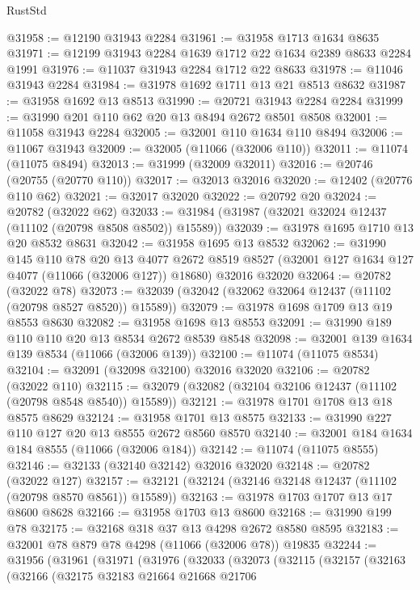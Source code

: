 \begin{lexlean}{RustStd}
\begin{coremodule}
@31958 := @12190 @31943 @2284
@31961 := @31958 @1713 @1634 @8635
@31971 := @12199 @31943 @2284 @1639 @1712 @22 @1634 @2389 @8633 @2284 @1991
@31976 := @11037 @31943 @2284 @1712 @22 @8633
@31978 := @11046 @31943 @2284
@31984 := @31978 @1692 @1711 @13 @21 @8513 @8632
@31987 := @31958 @1692 @13 @8513
@31990 := @20721 @31943 @2284 @2284
@31999 := @31990 @201 @110 @62 @20 @13 @8494 @2672 @8501 @8508
@32001 := @11058 @31943 @2284
@32005 := @32001 @110 @1634 @110 @8494
@32006 := @11067 @31943
@32009 := @32005 (@11066 (@32006 @110))
@32011 := @11074 (@11075 @8494)
@32013 := @31999 (@32009 @32011)
@32016 := @20746 (@20755 (@20770 @110))
@32017 := @32013 @32016
@32020 := @12402 (@20776 @110 @62)
@32021 := @32017 @32020
@32022 := @20792 @20
@32024 := @20782 (@32022 @62)
@32033 := @31984 (@31987 (@32021 @32024 @12437 (@11102 (@20798 @8508 @8502)) @15589))
@32039 := @31978 @1695 @1710 @13 @20 @8532 @8631
@32042 := @31958 @1695 @13 @8532
@32062 := @31990
    @145
    @110
    @78
    @20
    @13
    @4077
    @2672
    @8519
    @8527
    (@32001 @127 @1634 @127 @4077 (@11066 (@32006 @127)) @18680)
    @32016
    @32020
@32064 := @20782 (@32022 @78)
@32073 := @32039 (@32042 (@32062 @32064 @12437 (@11102 (@20798 @8527 @8520)) @15589))
@32079 := @31978 @1698 @1709 @13 @19 @8553 @8630
@32082 := @31958 @1698 @13 @8553
@32091 := @31990 @189 @110 @110 @20 @13 @8534 @2672 @8539 @8548
@32098 := @32001 @139 @1634 @139 @8534 (@11066 (@32006 @139))
@32100 := @11074 (@11075 @8534)
@32104 := @32091 (@32098 @32100) @32016 @32020
@32106 := @20782 (@32022 @110)
@32115 := @32079 (@32082 (@32104 @32106 @12437 (@11102 (@20798 @8548 @8540)) @15589))
@32121 := @31978 @1701 @1708 @13 @18 @8575 @8629
@32124 := @31958 @1701 @13 @8575
@32133 := @31990 @227 @110 @127 @20 @13 @8555 @2672 @8560 @8570
@32140 := @32001 @184 @1634 @184 @8555 (@11066 (@32006 @184))
@32142 := @11074 (@11075 @8555)
@32146 := @32133 (@32140 @32142) @32016 @32020
@32148 := @20782 (@32022 @127)
@32157 := @32121 (@32124 (@32146 @32148 @12437 (@11102 (@20798 @8570 @8561)) @15589))
@32163 := @31978 @1703 @1707 @13 @17 @8600 @8628
@32166 := @31958 @1703 @13 @8600
@32168 := @31990 @199 @78
@32175 := @32168 @318 @37 @13 @4298 @2672 @8580 @8595
@32183 := @32001 @78 @879 @78 @4298 (@11066 (@32006 @78)) @19835
@32244 := @31956
    (@31961
      (@31971
        (@31976
          (@32033
            (@32073
              (@32115
                (@32157
                  (@32163
                    (@32166
                      (@32175
                        @32183
                        @21664
                        @21668
                        @21706

\end{coremodule}
\end{lexlean}
